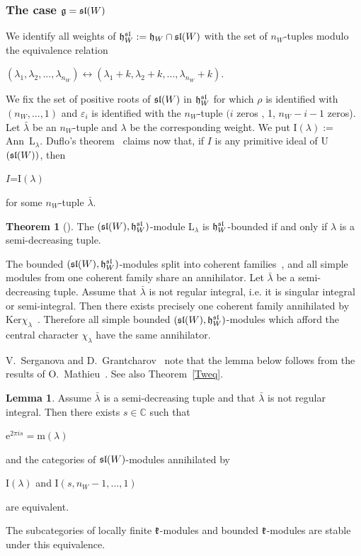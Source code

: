 \documentclass[12pt]{amsart}
\theoremstyle{definition}\newtheorem{theorem}{Theorem}[section]
\newtheorem{lemma}[proposition]{Lemma}
\theoremstyle{definition}\newtheorem{definition}[proposition]{Definition}
\theoremstyle{remark}\newtheorem{example}[proposition]{Example}
\begin{document}
\subsubsection{The case $\frak g=\frak{sl}(W)$}\label{SSbmsl}We identify all weights of $\frak h^{\frak{sl}}_W:=\frak h_W\cap\frak{sl}(W)$ with the set of $n_W$-tuples modulo the equivalence relation\begin{center}
$(\lambda_1, \lambda_2,...,
\lambda_{n_W})\leftrightarrow(\lambda_1+k, \lambda_2+k,...,
\lambda_{n_W}+k).$\end{center} We fix the set of positive roots of
$\frak{sl}(W)$ in $\frak h_W^\frak{sl}$ for which $\rho$ is
identified with $(n_W,..., 1)$ and $\varepsilon_i$ is identified
with the $n_W$-tuple $(i$ zeros , 1, $n_W-i-1$ zeros). Let
$\bar\lambda$ be an $n_W$-tuple and $\lambda$ be the corresponding
weight. We put I$(\lambda):=$Ann~L$_\lambda$. Duflo's
theorem~\cite{Dix} claims now that, if $I$ is any primitive ideal of
U$(\frak{sl}(W))$, then \begin{center}$I$=I$(\lambda)$\end{center}
for some $n_W$-tuple $\bar\lambda$.
\begin{theorem}[\cite{M}]\label{Tsmo} The $(\frak{sl}(W), \frak h^{\frak{sl}}_W)$-module L$_\lambda$ is $\frak h^{\frak{sl}}_W$-bounded if and only if $\lambda$ is a semi-decreasing tuple.\end{theorem}
The bounded $(\frak{sl}(W), \frak h^{\frak{sl}}_W)$-modules split into coherent families~\cite{M}, and all simple modules from one coherent family share an annihilator. Let $\bar\lambda$ be a semi-decreasing tuple. Assume that $\bar\lambda$ is not regular integral, i.e. it is singular integral or semi-integral. Then there exists precisely one coherent family annihilated by Ker$\chi_\lambda$~\cite{M}. Therefore all simple bounded $(\frak{sl}(W), \frak h^{\frak{sl}}_W)$-modules which afford the central character $\chi_\lambda$ have the same annihilator.

V.~Serganova and D.~Grantcharov~\cite{GrS1} note that the lemma below follows from the results of O.~Mathieu~\cite{M}. See also Theorem~\ref{Tweq}.
\begin{lemma}\label{Lsoch} Assume $\bar\lambda$ is a semi-decreasing tuple and that $\bar\lambda$ is not regular integral. Then there exists $s\in\mathbb C$ such that \begin{center}e$^{2\pi is}=$m$(\lambda)$\end{center} and the categories of $\frak{sl}(W)$-modules annihilated by \begin{center}I$(\lambda)$ and I$(s, n_W-1,...,1)$\end{center} are equivalent.\end{lemma}
The subcategories of locally finite $\frak k$-modules and bounded $\frak k$-modules are stable under this equivalence.
\end{document}
